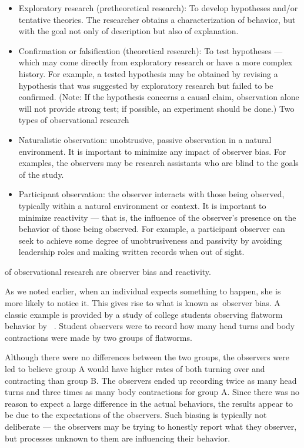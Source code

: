 \begin{refsection}
\begin{itemize}
\item Exploratory research (pretheoretical research): To develop hypotheses and\slash or tentative theories. The researcher obtains a characterization of behavior, but with the goal not only of description but also of explanation.

\item Confirmation or falsification (theoretical research): To test hypotheses --- which may come directly from exploratory research or have a more complex history. For example, a tested hypothesis may be obtained by revising a hypothesis that was suggested by exploratory research but failed to be confirmed. (Note: If the hypothesis concerns a causal claim, observation alone will not provide strong test; if possible, an experiment should be done.)
Two types of observational research

\item Naturalistic observation: unobtrusive, passive observation in a natural environment. It is important to minimize any impact of observer bias. For examples, the observers may be research assistants who are blind to the goals of the study.

\item Participant observation: the observer interacts with those being observed, typically within a natural environment or context. It is important to minimize reactivity --- that is, the influence of the observer's presence on the behavior of those being observed. For example, a participant observer can seek to achieve some degree of unobtrusiveness and passivity by avoiding leadership roles and making written records when out of sight.

\end{itemize}

 of observational research are observer bias and reactivity.

As we noted earlier, when an individual expects something to happen, she is more likely to notice it. This gives rise to what is known as observer bias. A classic example is provided by a study of college students observing flatworm behavior by ~\citep{Cordaro:2016bv}. Student observers were to record how many head turns and body contractions were made by two groups of flatworms. 

Although there were no differences between the two groups, the observers were led to believe group A would have higher rates of both turning over and contracting than group B. The observers ended up recording twice as many head turns and three times as many body contractions for group A. Since there was no reason to expect a large difference in the actual behaviors, the results appear to be due to the expectations of the observers. Such biasing is typically not deliberate --- the observers may be trying to honestly report what they observer, but processes unknown to them are influencing their behavior.


\end{refsection}

